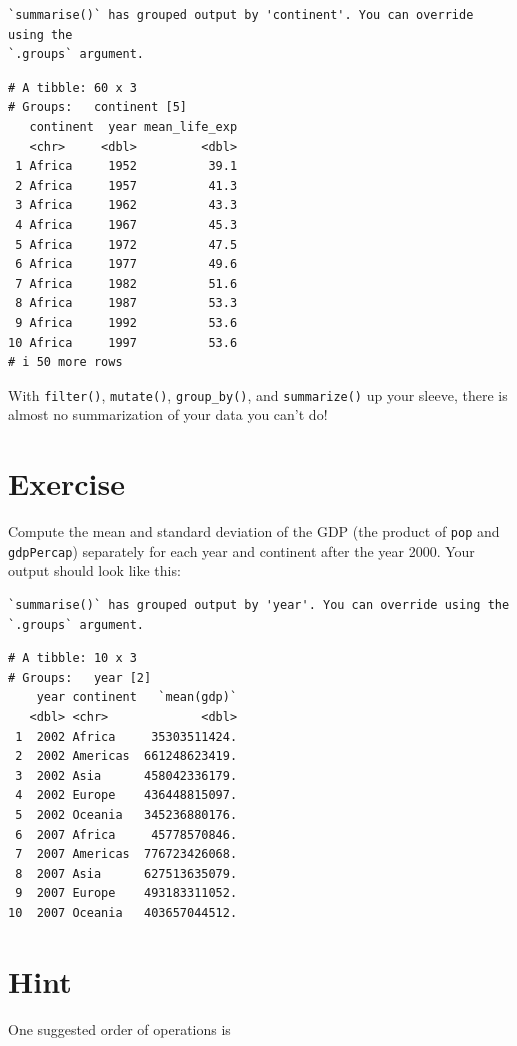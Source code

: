 \documentclass[
  letterpaper,
  DIV=11,
  numbers=noendperiod]{scrreprt}
\begin{document}
\begin{verbatim}
`summarise()` has grouped output by 'continent'. You can override using the
`.groups` argument.
\end{verbatim}

\begin{verbatim}
# A tibble: 60 x 3
# Groups:   continent [5]
   continent  year mean_life_exp
   <chr>     <dbl>         <dbl>
 1 Africa     1952          39.1
 2 Africa     1957          41.3
 3 Africa     1962          43.3
 4 Africa     1967          45.3
 5 Africa     1972          47.5
 6 Africa     1977          49.6
 7 Africa     1982          51.6
 8 Africa     1987          53.3
 9 Africa     1992          53.6
10 Africa     1997          53.6
# i 50 more rows
\end{verbatim}

With \texttt{filter()}, \texttt{mutate()}, \texttt{group\_by()}, and
\texttt{summarize()} up your sleeve, there is almost no summarization of
your data you can't do!

\section{Exercise}

Compute the mean and standard deviation of the GDP (the product of
\texttt{pop} and \texttt{gdpPercap}) separately for each year and
continent after the year 2000. Your output should look like this:

\begin{verbatim}
`summarise()` has grouped output by 'year'. You can override using the
`.groups` argument.
\end{verbatim}

\begin{verbatim}
# A tibble: 10 x 3
# Groups:   year [2]
    year continent   `mean(gdp)`
   <dbl> <chr>             <dbl>
 1  2002 Africa     35303511424.
 2  2002 Americas  661248623419.
 3  2002 Asia      458042336179.
 4  2002 Europe    436448815097.
 5  2002 Oceania   345236880176.
 6  2007 Africa     45778570846.
 7  2007 Americas  776723426068.
 8  2007 Asia      627513635079.
 9  2007 Europe    493183311052.
10  2007 Oceania   403657044512.
\end{verbatim}

\section{Hint}

One suggested order of operations is
\end{document}
